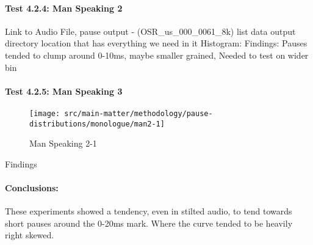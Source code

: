 \paragraph{Test 4.2.4: Man Speaking 2} 
Link to Audio File, pause output - (OSR\_us\_000\_0061\_8k)
list data output directory location that has everything we need in it
Histogram: 
Findings: Pauses tended to clump around 0-10ms, maybe smaller grained, Needed to test on wider bin 

\paragraph{Test 4.2.5: Man Speaking 3}
\begin{figure}[h]
	\begin{center}
		\texttt{[image: src/main-matter/methodology/pause-distributions/monologue/man2-1]}
		\caption{Man Speaking 2-1}
		\label{default}
	\end{center}
\end{figure}
    Findings


\paragraph{Conclusions:} These experiments showed a tendency, even in stilted audio, to tend towards short pauses around the 0-20ms mark. Where the curve tended to be heavily right skewed.